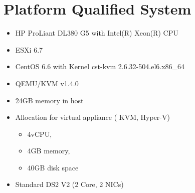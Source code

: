 \documentclass[letterpaper,10pt,english]{sphinxmanual}
\begin{document}
\section{Platform Qualified System}
\label{\detokenize{relnotes:platform-qualified-system}}
\begin{itemize}
\item {} 
HP ProLiant DL380 G5 with Intel(R) Xeon(R) CPU

\item {} 
ESXi 6.7

\item {} 
CentOS 6.6 with Kernel cst-kvm 2.6.32-504.el6.x86\_64

\item {} 
QEMU/KVM v1.4.0

\end{itemize}

\begin{itemize}
\item {} 
24GB memory in host

\item {} 
Allocation for virtual appliance ( KVM, Hyper-V)
\begin{itemize}
\item {} 
4vCPU,

\item {} 
4GB memory,

\item {} 
40GB disk space

\end{itemize}

\item {} 
Standard DS2 V2 (2 Core, 2 NICs)

\end{itemize}



\renewcommand{\indexname}{Index}
\printindex
\end{document}
